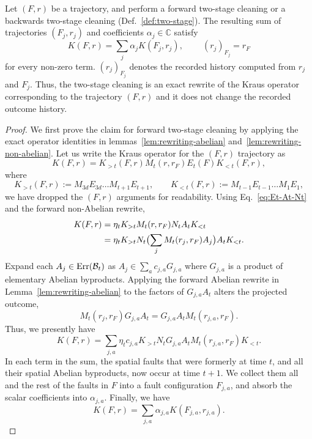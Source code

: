 \documentclass[11pt]{article}
\begin{document}
\begin{lemma}
\label{lem:cleaning-equivalence}
    Let $(F,r)$ be a trajectory, and perform a forward two-stage cleaning or a backwards
    two-stage cleaning (Def.~\ref{def:two-stage}). The resulting sum of trajectories $(F_j,r_j)$ and coefficients $\alpha_j\in \mathbb{C}$ satisfy
    \[
    K(F,r) = \sum_j \alpha_j  K(F_j,r_j),\ \qquad (r_j)_{F_j} = r_F
    \]
    for every non-zero term. $(r_j)_{F_j}$ denotes the recorded history computed from $r_j$ and $F_j$.
    Thus, the two-stage cleaning is an exact rewrite of the Kraus operator corresponding to the trajectory $(F,r)$ and it does not change the recorded outcome history.
\end{lemma}
\begin{proof}
    We first prove the claim for forward two-stage cleaning by applying the exact operator identities in lemmas~\ref{lem:rewriting-abelian} and~\ref{lem:rewriting-non-abelian}.
    Let us write the Kraus operator for the $(F,r)$ trajectory as
    \[
        K(F,r) = K_{>t}(F,r)M_t(r,r_F) E_t(F) K_{<t}(F,r),
    \]
    where 
    \[
    K_{>t}(F,r):= M_{3d}E_{3d}\dots M_{t+1}E_{t+1},\qquad
    K_{<t}(F,r):= M_{t-1}E_{t-1}\dots M_1E_1,
    \]
    we have dropped the $(F,r)$ arguments for readability.
    Using Eq.~\eqref{eq:Et-At-Nt} and the forward non-Abelian rewrite, 
    \begin{align}
        K(F,r) &= \eta_t K_{>t} M_t(r,r_F)N_t A_t K_{<t}\notag\\
        &= \eta_t K_{>t} N_t \bigl( \sum_{j}M_{t}(r_j,r_F)A_j\bigr) A_t K_{<t}.
    \end{align}
    Expand each $A_j\in \mathrm{Err}(\mathcal{B}_t)$ as $A_j\in \sum_a c_{j,a}G_{j,a}$ where $G_{j,a}$ is a product of elementary Abelian byproducts.
    Applying the forward Abelian rewrite in Lemma~\ref{lem:rewriting-abelian} to the factors of $G_{j,a}A_t$ alters the projected outcome,
    \[
    M_t(r_j,r_F) G_{j,a} A_t = G_{j,a} A_t M_t(r_{j,a}, r_F).
    \]
    Thus, we presently have
    \[
    K(F,r) = \sum_{j,a} \eta_t c_{j,a} K_{>t} N_t G_{j,a} A_t M_{t}(r_{j,a},r_F) K_{<t}.
    \]
    In each term in the sum, the spatial faults that were formerly at time $t$, and all their spatial Abelian byproducts, now occur at time $t+1$.
    We collect them all and the rest of the faults in $F$ into a fault configuration $F_{j,a}$, and absorb the scalar coefficients into $\alpha_{j,a}$.
    Finally, we have 
    \[
    K(F,r) = \sum_{j,a} \alpha_{j,a} K(F_{j,a},r_{j,a}).
    \]


\end{proof}
\end{document}
